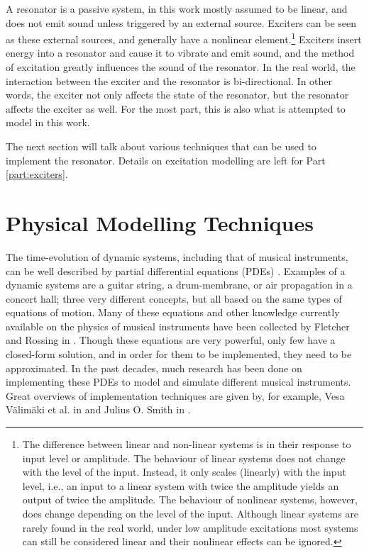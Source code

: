 A resonator is a passive system, in this work mostly assumed to be linear, and does not emit sound unless triggered by an external source. Exciters can be seen as these external sources, and generally have a nonlinear element.\footnote{The difference between linear and non-linear systems is in their response to input level or amplitude. The behaviour of linear systems does not change with the level of the input. Instead, it only scales (linearly) with the input level, i.e., an input to a linear system with twice the amplitude yields an output of twice the amplitude. The behaviour of nonlinear systems, however, does change depending on the level of the input. Although linear systems are rarely found in the real world, under low amplitude excitations most systems can still be considered linear and their nonlinear effects can be ignored.} Exciters insert energy into a resonator and cause it to vibrate and emit sound, and the method of excitation greatly influences the sound of the resonator. In the real world, the interaction between the exciter and the resonator is bi-directional. In other words, the exciter not only affects the state of the resonator, but the resonator affects the exciter as well. For the most part, this is also what is attempted to model in this work.

The next section will talk about various techniques that can be used to implement the resonator. Details on  excitation modelling are left for Part \ref{part:exciters}.

\section{Physical Modelling Techniques}\label{sec:physModTech}
The time-evolution of dynamic systems, including that of musical instruments, can be well described by partial differential equations (PDEs) \cite{Fletcher1998, theBible}. Examples of a dynamic systems are a guitar string, a drum-membrane, or air propagation in a concert hall; three very different concepts, but all based on the same types of equations of motion. Many of these equations and other knowledge currently available on the physics of musical instruments have been collected by Fletcher and Rossing in \cite{Fletcher1998}. Though these equations are very powerful, only few have a closed-form solution, and in order for them to be implemented, they need to be approximated. In the past decades, much research has been done on implementing these PDEs to model and simulate different musical instruments. Great overviews of implementation techniques are given by, for example, Vesa V{\"a}lim{\"a}ki et al. in \cite{Valimaki2006} and Julius O. Smith in \cite{Smith2010a, Smith2010b}. 
\\

